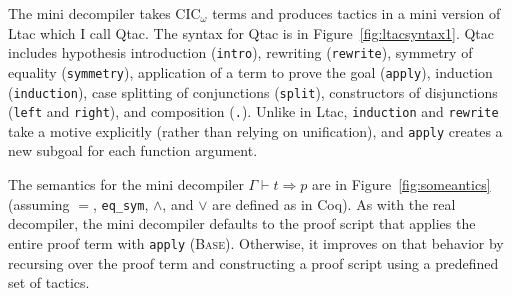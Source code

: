The mini decompiler takes CIC$_{\omega}$ terms and produces tactics in a 
mini version of Ltac which I call Qtac.
The syntax for Qtac is in Figure~\ref{fig:ltacsyntax1}.
Qtac includes hypothesis introduction (\lstinline{intro}),
rewriting (\lstinline{rewrite}), symmetry of equality (\lstinline{symmetry}),
application of a term to prove the goal (\lstinline{apply}), induction (\lstinline{induction}),
case splitting of conjunctions (\lstinline{split}),
constructors of disjunctions (\lstinline{left} and \lstinline{right}), and
composition (\lstinline{.}).
Unlike in Ltac, \lstinline{induction} and \lstinline{rewrite} take a motive explicitly (rather than relying on unification),
and \lstinline{apply} creates a new subgoal for each function argument.

The semantics for the mini decompiler $\Gamma \vdash t \Rightarrow p$ are in Figure~\ref{fig:someantics} (assuming $=$, \lstinline{eq_sym}, $\wedge$, and $\vee$ are defined as in Coq).
As with the real decompiler, the mini decompiler defaults to the proof script
that applies the entire proof term with \lstinline{apply} (\textsc{Base}).
Otherwise, it improves on that behavior by recursing over the proof term and constructing a proof script using a predefined set of tactics.

\iffalse
\begin{figure*}
\begin{minipage}{0.48\textwidth}
\begin{lstlisting}
fun (@\codesimb{(y0 : list A)}@) =>(@\vspace{-0.04cm}@)
  (@\codesima{list\_rect}@) _ _  (fun (@\codesima{a l H}@) =>(@\vspace{-0.04cm}@)
    (@\codesimc{eq\_ind\_r}@) _ (@\codesimd{eq\_refl}@) (@\codesimc{(app\_nil\_r (rev l) (a::[]))}@))(@\vspace{-0.04cm}@)
    (@\codesime{eq\_refl}@)(@\vspace{-0.04cm}@)
    (@\codesima{y0}@)(@\vspace{-0.04cm}@)
\end{lstlisting}
\end{minipage}
\begin{minipage}{0.48\textwidth}
\begin{lstlisting}
(@\vspace{-0.14cm}@)
- (@\codesimb{intro y0.}@) (@\codesima{induction y0 as [a l H|].}@)(@\vspace{-0.04cm}@)
  + (@\codesimc{simpl. rewrite app\_nil\_r.}@) (@\codesimd{auto.}@)(@\vspace{-0.04cm}@)
  + (@\codesime{auto.}@)(@\vspace{-0.04cm}@)
(@\vspace{-0.14cm}@)
\end{lstlisting}
\end{minipage}
\vspace{-0.3cm}
\caption{Proof term (left) and decompiled proof script (right) for the base case of 
\lstinline{rev_app_distr} (Section~\ref{sec:overview}),  with corresponding terms and tactics 
grouped by color and number.}
\label{fig:rainbow}
\end{figure*}
\fi

